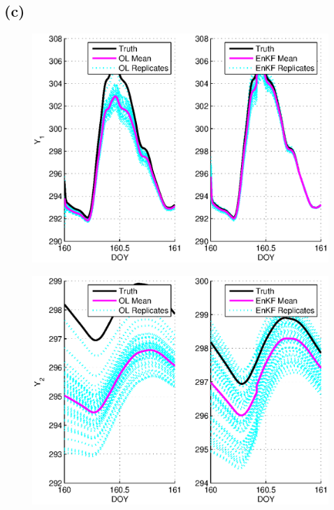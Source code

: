 \documentclass[letterpaper]{tufte-handout}
\begin{document}
\subsection{(c)}
{\small
  
}
\begin{figure}
  \includegraphics[width=\textwidth]{3cy1}
  \caption{}
\end{figure}
\begin{figure}
  \includegraphics[width=\textwidth]{3cy2}
  \caption{}
\end{figure}
\end{document}

